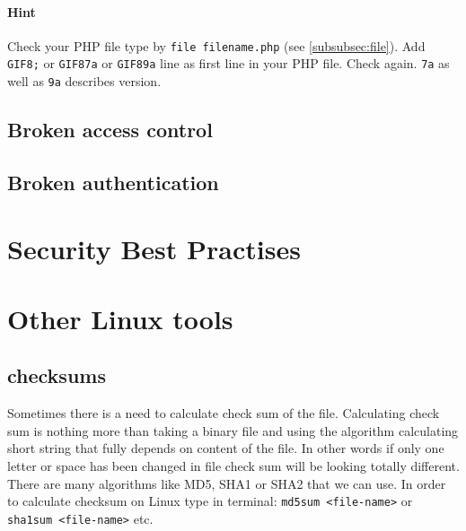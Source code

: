 \documentclass{article}[12pt]
\newcommand{\q}[1]{\texttt{#1}}
\begin{document}
\paragraph{Hint} Check your PHP file type by \texttt{file filename.php} (see \ref{subsubsec:file}). Add \texttt{GIF8;} or \q{GIF87a} or \q{GIF89a} line as first line in your PHP file.
Check again.
\q{7a} as well as \q{9a} describes version.





\subsection{Broken access control}
\subsection{Broken authentication}
\section{Security Best Practises}




\section{Other Linux tools}
\subsection{checksums}
Sometimes there is a need to calculate check sum of the file.
Calculating check sum is nothing more than taking a binary file and using the algorithm calculating short string that fully depends on content of the file.
In other words if only one letter or space has been changed in file check sum will be looking totally different.
There are many algorithms like MD5, SHA1 or SHA2 that we can use.
In order to calculate checksum on Linux type in terminal:
\texttt{md5sum <file-name>} or \texttt{sha1sum <file-name>} etc.
\end{document}
